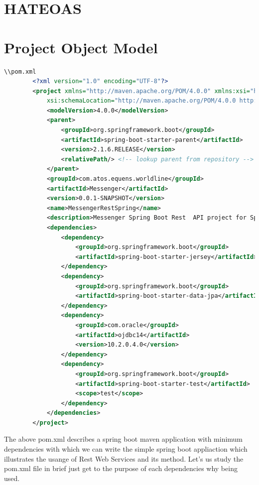 \documentclass{report}
\begin{document}
	\section{HATEOAS}
	\newpage
	\section{Project Object Model}	
	
	\begin{lstlisting}[language = xml]
	\\pom.xml
		<?xml version="1.0" encoding="UTF-8"?>
		<project xmlns="http://maven.apache.org/POM/4.0.0" xmlns:xsi="http://www.w3.org/2001/XMLSchema-instance"
			xsi:schemaLocation="http://maven.apache.org/POM/4.0.0 http://maven.apache.org/xsd/maven-4.0.0.xsd">
			<modelVersion>4.0.0</modelVersion>
			<parent>
				<groupId>org.springframework.boot</groupId>
				<artifactId>spring-boot-starter-parent</artifactId>
				<version>2.1.6.RELEASE</version>
				<relativePath/> <!-- lookup parent from repository -->
			</parent>
			<groupId>com.atos.equens.worldline</groupId>
			<artifactId>Messenger</artifactId>
			<version>0.0.1-SNAPSHOT</version>
			<name>MessengerRestSpring</name>
			<description>Messenger Spring Boot Rest  API project for Spring Boot</description>
			<dependencies>
				<dependency>
					<groupId>org.springframework.boot</groupId>
					<artifactId>spring-boot-starter-jersey</artifactId>
				</dependency>
				<dependency>
					<groupId>org.springframework.boot</groupId>
					<artifactId>spring-boot-starter-data-jpa</artifactId>
				</dependency>
				<dependency>
					<groupId>com.oracle</groupId>
					<artifactId>ojdbc14</artifactId>
					<version>10.2.0.4.0</version>
				</dependency>
				<dependency>
					<groupId>org.springframework.boot</groupId>
					<artifactId>spring-boot-starter-test</artifactId>
					<scope>test</scope>
				</dependency>
			</dependencies>
		</project>
	\end{lstlisting}
	The above pom.xml describes a spring boot maven application with minimum dependencies with which we can write the simple spring boot appliaction which illustrates the usange of Rest Web Services and its method.
	Let’s us study the pom.xml file in brief just get to the purpose of each dependencies why being used.
\end{document}
